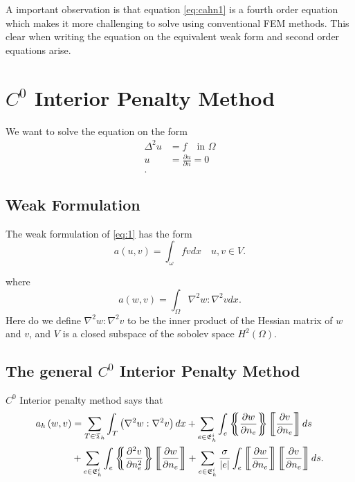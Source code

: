 A important observation is that equation \eqref{eq:cahn1} is a fourth order equation which makes it more challenging to
solve using conventional FEM methods. This clear when writing the equation on the equivalent weak form and second order
equations arise.


\section{$C^0$ Interior Penalty Method}\label{sec:ch1}


We want to solve the equation on the form
\begin{align}
    \label{eq:1}
    \Delta^{2} u &= f \quad \text{in } \Omega  \\
    u &= \frac{\partial u}{\partial n} = 0  \\
.\end{align}

\subsection{Weak Formulation}%
\label{sub:weak_formulation}


The weak formulation of \eqref{eq:1} has the form
\begin{equation}
\label{eq:2}
    a\left( u,v \right) = \int_{\omega}^{} f v dx \quad u,v \in V
.\end{equation}

where
\begin{equation}
\label{eq:3}
    a\left( w,v \right) = \int_{\Omega }^{} \nabla ^2 w : \nabla ^2 v dx
.\end{equation}
Here do we define $\nabla ^2 w : \nabla ^2 v $ to be the inner product of the Hessian matrix of $w$  and $v$, and $V$
is a closed subspace of the sobolev space $H^2\left( \Omega  \right)$.


\subsection{The general $C^0$ Interior Penalty Method}%
\label{sub:_c_0_interior_penalty_method}


$C^{0}$ Interior penalty method says that
\begin{align*}
    a_{h} \left( w,v \right) &= \sum_{T \in \mathfrak{T} _{h}}^{} \int_{T}^{} \left( \nabla ^2 w : \nabla ^2 v \right)
    dx  + \sum_{e \in \mathfrak{E} _{h}^{i}}^{} \int_{e}^{} \mean{ \frac{\partial w}{\partial n_{e}} } \jump{
    \frac{\partial v}{\partial n_{e}} } ds        \\
    & + \sum_{e \in \mathfrak{E} _{h}^{i}}^{}  \int_{e}^{}  \mean{ \frac{\partial ^2 v}{\partial n_{e}^2 } } \jump{
    \frac{\partial w}{\partial n_{e}} }     + \sum_{e \in \mathfrak{E} _{h}^{i}}^{}  \frac{\sigma }{\left\lvert e
\right\rvert } \int_{e}^{} \jump{ \frac{\partial w}{\partial n_{e}} } \jump{ \frac{\partial v}{\partial n_{e}} } ds
.\end{align*}

